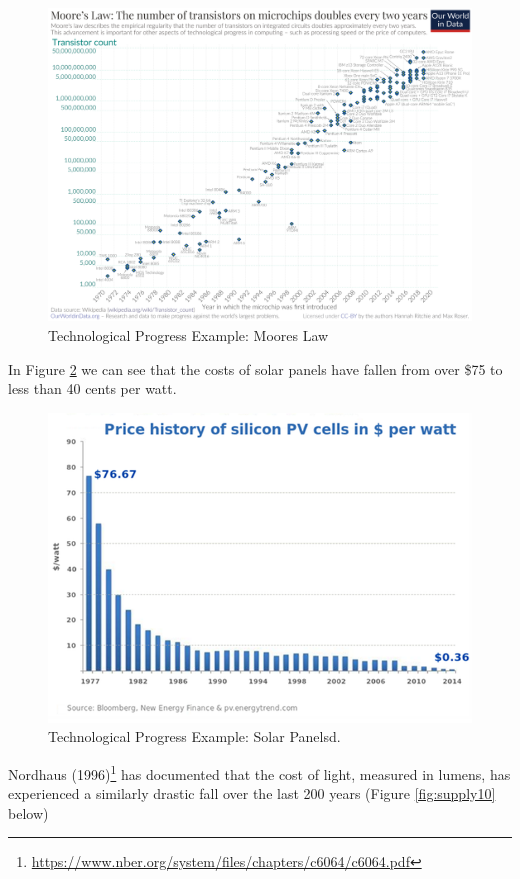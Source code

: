 \documentclass[
]{book}
\begin{document}
\begin{figure}

{\centering \includegraphics[width=0.75\linewidth]{img/supply/fig8} 

}

\caption{Technological Progress Example: Moores Law}\label{fig:supply08}
\end{figure}

In Figure \ref{fig:supply09} we can see that the costs of solar panels have fallen from over \$75 to less than 40 cents per watt.

\begin{figure}

{\centering \includegraphics[width=0.75\linewidth]{img/supply/fig9} 

}

\caption{Technological Progress Example: Solar Panelsd.}\label{fig:supply09}
\end{figure}

Nordhaus (1996)\footnote{\url{https://www.nber.org/system/files/chapters/c6064/c6064.pdf}} has documented that the cost of light, measured in lumens, has experienced a similarly drastic fall over the last 200 years (Figure \ref{fig:supply10} below)
\end{document}

